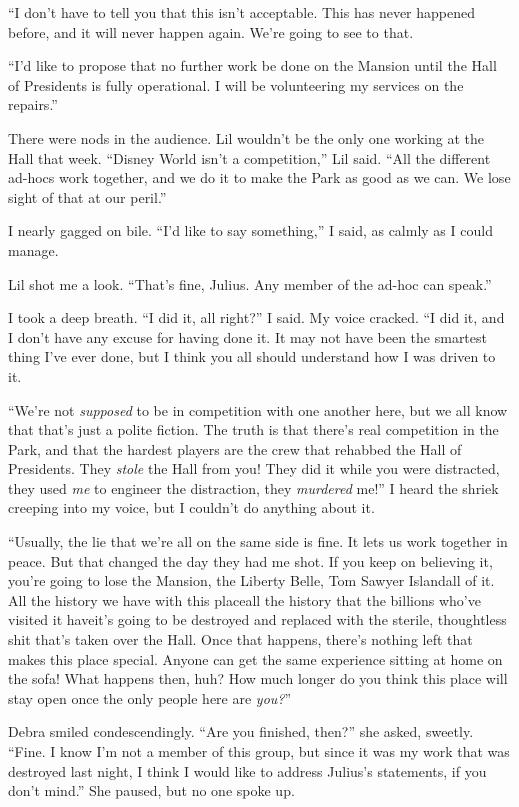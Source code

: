 “I don't have to tell you that this isn't acceptable. This has
never happened before, and it will never happen again. We're going
to see to that.

“I'd like to propose that no further work be done on the Mansion
until the Hall of Presidents is fully operational. I will be
volunteering my services on the repairs.”

There were nods in the audience. Lil wouldn't be the only one
working at the Hall that week. “Disney World isn't a competition,”
Lil said. “All the different ad-hocs work together, and we do it to
make the Park as good as we can. We lose sight of that at our
peril.”

I nearly gagged on bile. “I'd like to say something,” I said, as
calmly as I could manage.

Lil shot me a look. “That's fine, Julius. Any member of the ad-hoc
can speak.”

I took a deep breath. “I did it, all right?” I said. My voice
cracked. “I did it, and I don't have any excuse for having done it.
It may not have been the smartest thing I've ever done, but I think
you all should understand how I was driven to it.

“We're not \emph{supposed} to be in competition with one another
here, but we all know that that's just a polite fiction. The truth
is that there's real competition in the Park, and that the hardest
players are the crew that rehabbed the Hall of Presidents. They
\emph{stole} the Hall from you! They did it while you were
distracted, they used \emph{me} to engineer the distraction, they
\emph{murdered} me!” I heard the shriek creeping into my voice, but
I couldn't do anything about it.

“Usually, the lie that we're all on the same side is fine. It lets
us work together in peace. But that changed the day they had me
shot. If you keep on believing it, you're going to lose the
Mansion, the Liberty Belle, Tom Sawyer Island{\dash}all of it. All the
history we have with this place{\dash}all the history that the billions
who've visited it have{\dash}it's going to be destroyed and replaced with
the sterile, thoughtless shit that's taken over the Hall. Once that
happens, there's nothing left that makes this place special. Anyone
can get the same experience sitting at home on the sofa! What
happens then, huh? How much longer do you think this place will
stay open once the only people here are \emph{you?}”

Debra smiled condescendingly. “Are you finished, then?” she asked,
sweetly. “Fine. I know I'm not a member of this group, but since it
was my work that was destroyed last night, I think I would like to
address Julius's statements, if you don't mind.” She paused, but no
one spoke up.

